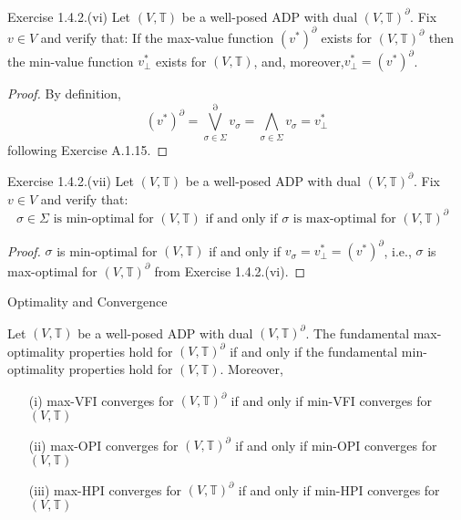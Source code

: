 \documentclass[aspectratio=169]{beamer} %
\begin{document}
\begin{frame}{Exercise 1.4.2.(vi)}
    Let $(V,\mathbb{T})$ be a well-posed ADP with dual $(V,\mathbb{T})^\partial$. Fix $v\in V$ and verify that: If the max-value function $(v^*)^\partial$ exists for $(V,\mathbb{T})^\partial$ then the min-value function $v_\perp^*$ exists for $(V,\mathbb{T})$, and, moreover,$v_\perp^* = (v^*)^\partial$.
    \begin{proof}
    By definition, 
    $$
    (v^*)^\partial  = \bigvee^\partial_{\sigma\in\Sigma} v_\sigma = \bigwedge_{\sigma\in\Sigma} v_\sigma  = v_\perp^* 
    $$
    following Exercise A.1.15.
\end{proof}
\end{frame}

\begin{frame}{Exercise 1.4.2.(vii)}
Let $(V,\mathbb{T})$ be a well-posed ADP with dual $(V,\mathbb{T})^\partial$. Fix $v\in V$ and verify that:
    $$
\text{$\sigma\in\Sigma$ is min-optimal for $(V,\mathbb{T})$ if and only if $\sigma$ is max-optimal for $(V,\mathbb{T})^\partial$ }
    $$
    \begin{proof}
        $\sigma$ is min-optimal for $(V,\mathbb{T})$ if and only if $v_\sigma = v_\perp^* = (v^*)^\partial$, i.e., $\sigma$ is max-optimal for $(V,\mathbb{T})^\partial$ from Exercise 1.4.2.(vi).
    \end{proof}
\end{frame}

\begin{frame}{Optimality and Convergence}
    \begin{theorem}
        Let $(V,\mathbb{T})$ be a well-posed ADP with dual $(V,\mathbb{T})^\partial$.  The fundamental max-optimality properties hold for $(V,\mathbb{T})^\partial$ if and only if the fundamental min-optimality properties hold for $(V,\mathbb{T})$. Moreover,
        \begin{enumerate}
            \item[(i)] max-VFI converges for $(V,\mathbb{T})^\partial$ if and only if min-VFI converges for $(V,\mathbb{T})$
            \item[(ii)] max-OPI converges for $(V,\mathbb{T})^\partial$ if and only if min-OPI converges for $(V,\mathbb{T})$
            \item[(iii)] max-HPI converges for $(V,\mathbb{T})^\partial$ if and only if min-HPI converges for $(V,\mathbb{T})$
            
        \end{enumerate}
    \end{theorem}
\end{frame}
\end{document}

